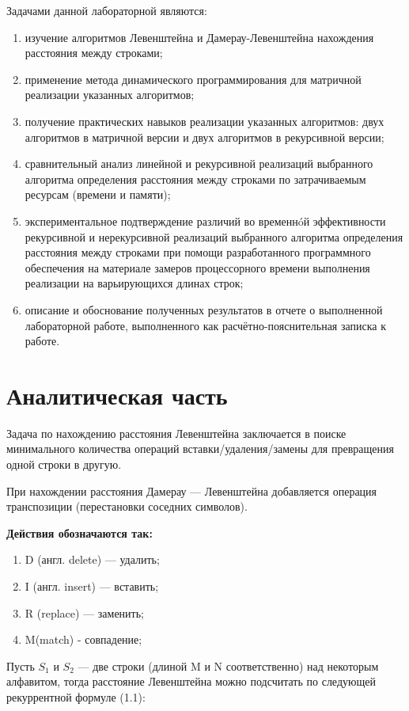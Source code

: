 \documentclass[12pt]{report}
\begin{document}
Задачами данной лабораторной являются:
\begin{enumerate}
  	\item изучение алгоритмов Левенштейна и Дамерау-Левенштейна нахождения расстояния между строками;
	\item применение метода динамического программирования для матричной реализации указанных алгоритмов; 
	\item получение практических навыков реализации указанных алгоритмов: двух алгоритмов в матричной версии и двух алгоритмов в рекурсивной версии; 
	\item сравнительный анализ линейной и рекурсивной реализаций выбранного алгоритма определения расстояния между строками по затрачиваемым ресурсам (времени и памяти); 
	\item экспериментальное подтверждение различий во временнóй эффективности рекурсивной и
нерекурсивной реализаций выбранного алгоритма определения расстояния между строками при
помощи разработанного программного обеспечения на материале замеров процессорного времени
выполнения реализации на варьирующихся длинах строк; 
	\item описание и обоснование полученных результатов в отчете о выполненной лабораторной
работе, выполненного как расчётно-пояснительная записка к работе. 
\end{enumerate}


\chapter{Аналитическая часть}
Задача по нахождению расстояния Левенштейна заключается в поиске минимального количества операций вставки/удаления/замены для превращения одной строки в другую.

При нахождении расстояния Дамерау — Левенштейна добавляется операция транспозиции (перестановки соседних символов).  
 
\textbf{Действия обозначаются так:} 
\begin{enumerate}
  	\item D (англ. delete) — удалить;
	\item I (англ. insert) — вставить;
	\item R (replace) — заменить;
	\item M(match) - совпадение;
\end{enumerate}

Пусть $S_{1}$ и $S_{2}$ — две строки (длиной M и N соответственно) над некоторым алфавитом, тогда расстояние Левенштейна можно подсчитать по следующей рекуррентной формуле (1.1):
\end{document}
